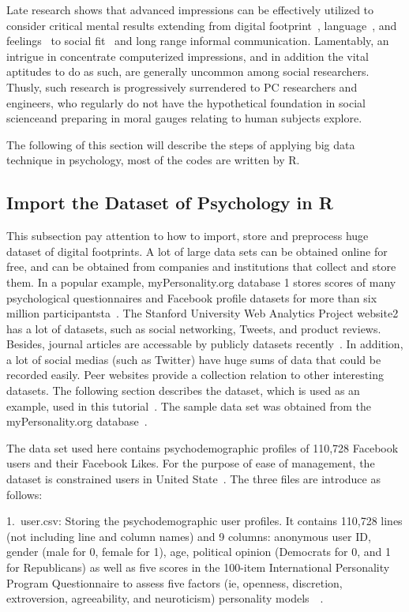 Late research shows that advanced impressions can be effectively 
utilized to consider critical mental results 
extending from digital footprint~\cite{hid515-14}, 
language~\cite{hid515-15}, and feelings~\cite{hid515-16}  
to social fit~\cite{hid515-17} and long range informal communication. 
Lamentably, an intrigue in concentrate computerized impressions, 
and in addition the vital aptitudes 
to do as such, are generally uncommon among social researchers. Thusly, 
such research is progressively surrendered to PC researchers and 
engineers, who regularly do not have the hypothetical foundation in
 social scienceand preparing in moral gauges relating to human 
subjects explore.

The following of this section will describe the steps of applying 
big data technique in psychology, most of the codes are written by R.

\subsection{Import the Dataset of Psychology in R~\cite{hid515-12}}

This subsection pay attention to how to import, 
store and preprocess huge dataset of digital footprints. 
A lot of large data sets can be obtained
 online for free, and can be obtained from companies and 
institutions that collect and store them. In a popular example, 
myPersonality.org database 1 stores scores of many 
psychological questionnaires and Facebook profile datasets 
for more 
than six million participantsta~\cite{hid515-11}. 
The Stanford University Web
Analytics Project website2 has a lot of datasets, such as
 social networking, Tweets, and product reviews. 
Besides, 
journal articles are accessable by publicly datasets 
recently~\cite{hid515-11}. 
 In addition, a lot of social medias (such as Twitter) 
have huge sums of data that could be recorded easily. 
Peer websites provide a collection relation to other interesting 
datasets. The following section 
describes the dataset, which is used as an example, used in this 
tutorial~\cite{hid515-11}. The sample 
data set was obtained from the myPersonality.org 
database~\cite{hid515-11}.

The data set used here contains psychodemographic profiles of 
110,728 Facebook users and their Facebook Likes. 
For the purpose of ease of management, the dataset is 
constrained users in 
United State~\cite{hid515-11}. 
The three files are introduce as follows:

1.\ user.csv: Storing the psychodemographic user profiles. It 
contains 
110,728 lines (not including line and column names) and 9 columns:
 anonymous user ID, gender (male for 0, female for 1), age, 
political opinion (Democrats for 0, and 1 for Republicans) 
as well as five scores in the 100-item International Personality 
Program Questionnaire to assess five factors (ie, openness, 
discretion, extroversion, agreeability, and neuroticism) 
personality models~\cite{hid515-18}~\cite{hid515-11}.

